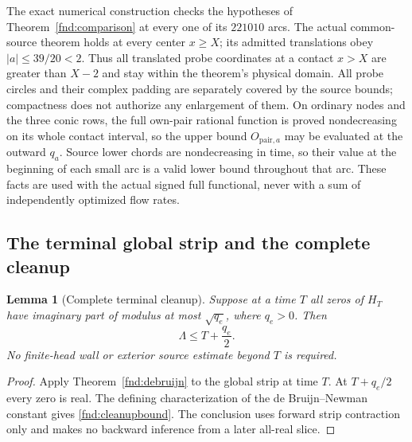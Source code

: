 \documentclass[11pt,a4paper]{article}
\newtheorem{lemma}[theorem]{Lemma}
\theoremstyle{definition}
\theoremstyle{remark}
\begin{document}
The exact numerical construction checks the hypotheses
of Theorem~\ref{fnd:comparison} at every one of its $221010$ arcs.
The actual common-source theorem holds at every center $x\geq X$; its
admitted translations obey $|a|\leq39/20<2$. Thus all translated probe
coordinates at a contact $x>X$ are greater than $X-2$ and stay within
the theorem's physical domain. All probe circles
and their complex padding are separately covered by the source bounds;
compactness does not authorize any enlargement of them. On ordinary
nodes and the three conic rows, the full own-pair rational function is
proved nondecreasing on its whole contact interval, so the upper bound
$O_{\mathrm{pair},a}$ may be evaluated at the outward $q_a$. Source lower chords are
nondecreasing in time, so their value at the beginning of each small
arc is a valid lower bound throughout that arc. These facts are used
with the actual signed full functional, never with a sum of independently
optimized flow rates.

\subsection{The terminal global strip and the complete cleanup}
\label{fnd:cleanupsection}

\begin{lemma}[Complete terminal cleanup]\label{fnd:cleanup}
Suppose at a time $T$ all zeros of $H_T$ have imaginary part of modulus
at most $\sqrt{q_e}$, where $q_e>0$. Then
\begin{equation}
 \Lambda\leq T+\frac{q_e}{2}.
 \label{fnd:cleanupbound}
\end{equation}
No finite-head wall or exterior source estimate beyond $T$ is required.
\end{lemma}
\begin{proof}
Apply Theorem~\ref{fnd:debruijn} to the global strip at time $T$.
At $T+q_e/2$ every zero is real. The defining characterization of the
de Bruijn--Newman constant \cite{deBruijn,Newman} gives
\eqref{fnd:cleanupbound}. The conclusion uses forward strip contraction
only and makes no backward inference from a later all-real slice.
\end{proof}
\end{document}
